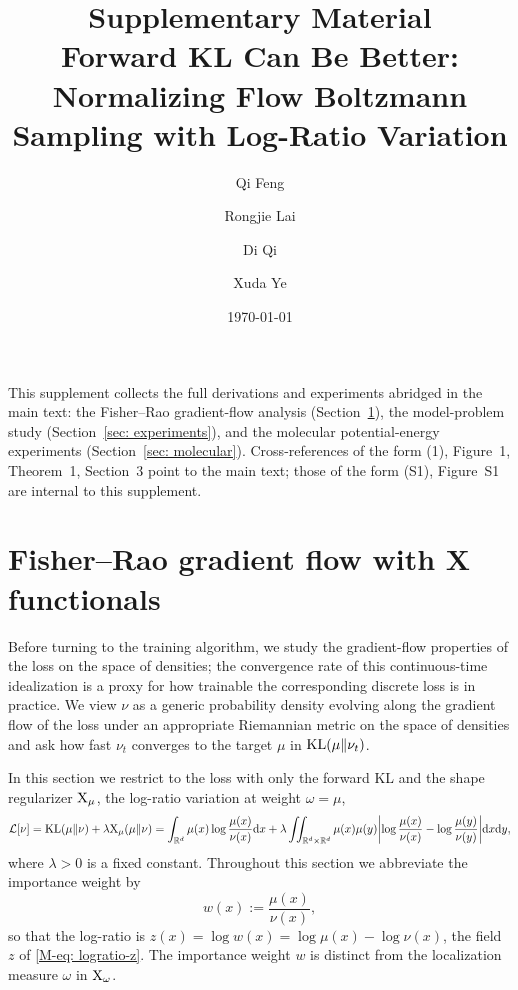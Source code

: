 \documentclass{article}
\title{Supplementary Material\\[2pt] Forward KL Can Be Better: Normalizing Flow Boltzmann Sampling with Log-Ratio Variation}
\author[1]{Qi Feng}
\author[2]{Rongjie Lai}
\author[2]{Di Qi}
\author[2]{Xuda Ye}
\affil[1]{Department of Mathematics, Florida State University, Tallahassee, FL 32306}
\affil[2]{Department of Mathematics, Purdue University, West Lafayette, IN 47907}
\date{\today}
\begin{document}
\maketitle

\noindent This supplement collects the full derivations and experiments abridged in the main text: the Fisher--Rao gradient-flow analysis (Section~\ref{sec: FR}), the model-problem study (Section~\ref{sec: experiments}), and the molecular potential-energy experiments (Section~\ref{sec: molecular}). Cross-references of the form (1), Figure~1, Theorem~1, Section~3 point to the main text; those of the form (S1), Figure~S1 are internal to this supplement.

\section{Fisher--Rao gradient flow with X functionals}
\label{sec: FR}

Before turning to the training algorithm, we study the gradient-flow properties of the loss on the space of densities; the convergence rate of this continuous-time idealization is a proxy for how trainable the corresponding discrete loss is in practice. We view $\nu$ as a generic probability density evolving along the gradient flow of the loss under an appropriate Riemannian metric on the space of densities \citep{ambrosio2008gradient,villani2009optimal} and ask how fast $\nu_t$ converges to the target $\mu$ in $\mathrm{KL}(\mu\|\nu_t)$.

In this section we restrict to the loss with only the forward KL and the shape regularizer $\mathrm{X}_\mu$, the log-ratio variation at weight $\omega = \mu$,
\begin{equation}
    \mathcal L[\nu] = \mathrm{KL}(\mu\|\nu) + \lambda  \mathrm{X}_\mu(\mu\|\nu) = \int_{\mathbb R^d} \mu(x) \log \frac{\mu(x)}{\nu(x)} \mathrm{d} x +
    \lambda\iint_{\mathbb R^d\times\mathbb R^d}
     \mu(x)\mu(y) \biggl|\log\frac{\mu(x)}{\nu(x)} - \log\frac{\mu(y)}{\nu(y)}\biggr| \mathrm{d} x \mathrm{d} y,
    \label{eq: loss KL X}
\end{equation}
where $\lambda>0$ is a fixed constant.
Throughout this section we abbreviate the importance weight by
\begin{equation*}
    w(x) := \frac{\mu(x)}{\nu(x)},
\end{equation*}
so that the log-ratio is $z(x) = \log w(x) = \log\mu(x) - \log\nu(x)$, the field $z$ of \eqref{M-eq: logratio-z}. The importance weight $w$ is distinct from the localization measure $\omega$ in $\mathrm{X}_\omega$.
\end{document}

